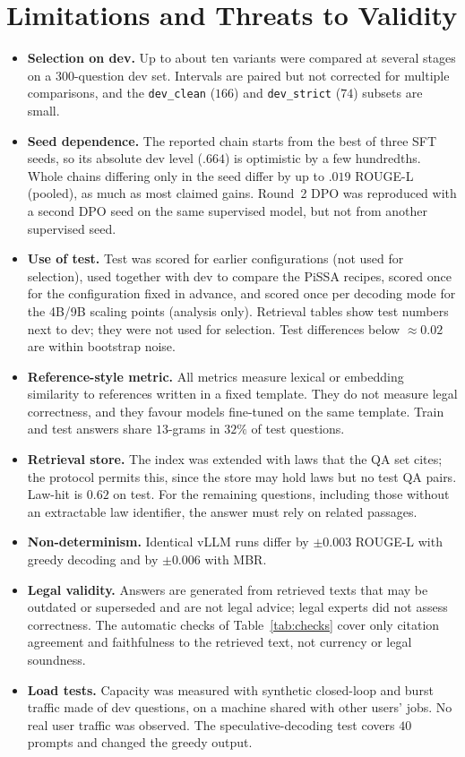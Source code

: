\documentclass[11pt,a4paper]{article}
\newcommand{\rl}{ROUGE-L}
\begin{document}
\section{Limitations and Threats to Validity}\label{sec:limits}
\begin{itemize}[leftmargin=*]
\item \textbf{Selection on dev.} Up to about ten variants were compared at several stages on a $300$-question dev set. Intervals are paired but not corrected for multiple comparisons, and the \texttt{dev\_clean} ($166$) and \texttt{dev\_strict} ($74$) subsets are small.
\item \textbf{Seed dependence.} The reported chain starts from the best of three SFT seeds, so its absolute dev level ($.664$) is optimistic by a few hundredths. Whole chains differing only in the seed differ by up to $.019$ \rl{} (pooled), as much as most claimed gains. Round~2 DPO was reproduced with a second DPO seed on the same supervised model, but not from another supervised seed.
\item \textbf{Use of test.} Test was scored for earlier configurations (not used for selection), used together with dev to compare the PiSSA recipes, scored once for the configuration fixed in advance, and scored once per decoding mode for the 4B/9B scaling points (analysis only). Retrieval tables show test numbers next to dev; they were not used for selection. Test differences below $\approx0.02$ are within bootstrap noise.
\item \textbf{Reference-style metric.} All metrics measure lexical or embedding similarity to references written in a fixed template. They do not measure legal correctness, and they favour models fine-tuned on the same template. Train and test answers share $13$-grams in $32\%$ of test questions.
\item \textbf{Retrieval store.} The index was extended with laws that the QA set cites; the protocol permits this, since the store may hold laws but no test QA pairs. Law-hit is $0.62$ on test. For the remaining questions, including those without an extractable law identifier, the answer must rely on related passages.
\item \textbf{Non-determinism.} Identical vLLM runs differ by $\pm0.003$ \rl{} with greedy decoding and by $\pm0.006$ with MBR.
\item \textbf{Legal validity.} Answers are generated from retrieved texts that may be outdated or superseded and are not legal advice; legal experts did not assess correctness. The automatic checks of Table~\ref{tab:checks} cover only citation agreement and faithfulness to the retrieved text, not currency or legal soundness.
\item \textbf{Load tests.} Capacity was measured with synthetic closed-loop and burst traffic made of dev questions, on a machine shared with other users' jobs. No real user traffic was observed. The speculative-decoding test covers $40$ prompts and changed the greedy output.
\end{itemize}
\end{document}
